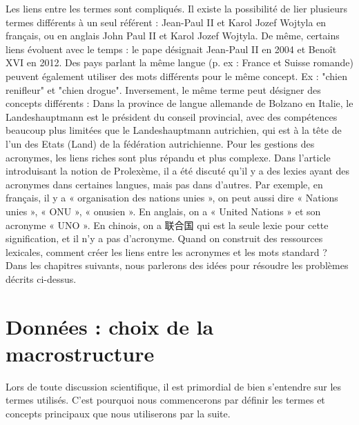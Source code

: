 \documentclass[10pt,a4paper,twoside]{article}
\begin{document}
Les liens entre les termes sont compliqués. Il existe la possibilité de lier plusieurs termes différents à un seul référent : Jean-Paul II et Karol Jozef Wojtyla en français, ou en anglais John Paul II et Karol Jozef Wojtyla. De même, certains liens évoluent avec le temps : le pape désignait Jean-Paul II en 2004 et Benoît XVI en 2012. Des pays parlant la même langue (p. ex : France et Suisse romande) peuvent également utiliser des mots différents pour le même concept. Ex : "chien renifleur" et "chien drogue". Inversement, le même terme peut désigner des concepts différents : Dans la province de langue allemande de Bolzano en Italie, le Landeshauptmann est le président du conseil provincial, avec des compétences beaucoup plus limitées que le Landeshauptmann autrichien, qui est à la tête de l'un des Etats (Land) de la fédération autrichienne.
Pour les gestions des acronymes, les liens riches sont plus répandu et plus complexe. Dans l'article introduisant la notion de Prolexème, il a été discuté qu’il y a des lexies ayant des acronymes dans certaines langues, mais pas dans d'autres. Par exemple, en français, il y a « organisation des nations unies », on peut aussi dire « Nations unies », « ONU », « onusien ». En anglais, on a « United Nations » et son acronyme « UNO ». En chinois, on a 联合国 qui est la seule lexie pour cette signification, et il n’y a pas d’acronyme. Quand on construit des ressources lexicales, comment créer les liens entre les acronymes et les mots standard ?\\
Dans les chapitres suivants, nous parlerons des idées pour résoudre les problèmes décrits ci-dessus. 

\section{Données : choix de la macrostructure}
Lors de toute discussion scientifique, il est primordial de bien s'entendre sur les termes utilisés. C'est pourquoi nous commencerons par définir les termes et concepts principaux que nous utiliserons par la suite.
\end{document}

